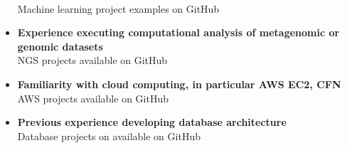 \documentclass[11pt, letterpaper]{CV_latex_class}
\begin{document}
\begin{cvletter}
\begin{itemize}
	\\ Machine learning project examples on GitHub
	\item {\bf Experience executing computational analysis of metagenomic or genomic datasets}
	\\ NGS projects available on GitHub
	\item {\bf Familiarity with cloud computing, in particular AWS EC2, CFN}
	\\ AWS projects available on GitHub
	\item {\bf Previous experience developing database architecture}
	\\ Database projects on available on GitHub
\end{itemize}

\end{cvletter}


\makeletterclosing

\end{document}
